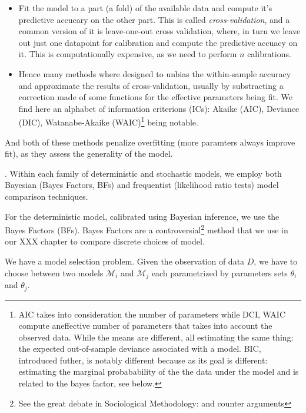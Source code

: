 \begin{itemize}
	\item Fit the model to a part (a fold) of the available data and compute it's predictive accucary on the other part. This is called \emph{cross-validation}, and a common version of it is leave-one-out cross validation, where, in turn we leave out just one datapoint for calibration and compute the predictive accuacy on it. This is computationally expensive, as we need to perform $n$ calibrations.
	\item Hence many methods where designed to unbias the within-sample accuracy and approximate the results of cross-validation, usually by substracting  a correction made of some functions for the effective parameters being fit. We find here an alphabet of information criterions (ICs):  Akaike (AIC), Deviance  (DIC), Watanabe-Akaike (WAIC)\footnote{AIC takes into consideration the number of parameters while DCI, WAIC compute aneffective number of parameters that takes into account the observed data. While the means are different,  all estimating the same thing: the expected out-of-sample deviance associated with a model. BIC, introduced futher, is notably different because as its goal is different: estimating the marginal probabability of the the data under the model and is related to the bayes factor, see below.} being notable.
\end{itemize}
And both of these methods penalize overfitting (more paramters always improve fit), as they assess the generality of the model.




. Within each family of deterministic and stochastic models, we employ both Bayesian (Bayes Factors, BFs) and frequentist (likelihood ratio tests) model comparison techniques. 

For the deterministic model, calibrated using Bayesian inference, we use the Bayes Factors (BFs). Bayes Factors are a controversial\footnote{See the great debate in Sociological Methodology: and counter arguments} method that we use in our XXX chapter to compare discrete choices of model.

We have a model selection problem. Given the observation of data $D$, we have to choose between two models $\mathcal{M}_i$ and $\mathcal{M}_j$ each parametrized by parameters sets $\theta_i$ and $\theta_j$.

